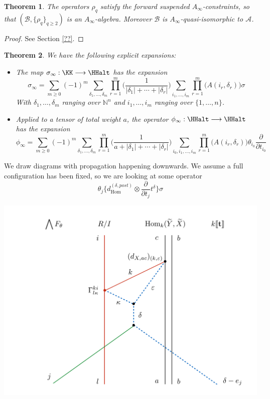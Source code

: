\documentclass[english,letter paper,12pt,leqno]{article}
\newtheorem{theorem}{Theorem}[section]
\theoremstyle{example}
\numberwithin{equation}{section}
\def\Hom{\operatorname{Hom}}
\begin{document}
\begin{theorem} The operators $\rho_q$ satisfy the forward suspended $A_\infty$-constraints, so that $(\mathscr{B}, \{ \rho_q \}_{q \ge 2})$ is an $A_\infty$-algebra. Moreover $\mathscr{B}$ is $A_\infty$-quasi-isomorphic to $\mathscr{A}$.
\end{theorem}
\begin{proof}
See Section \ref{??}.
\end{proof}

\begin{theorem} We have the following explicit expansions:
\begin{itemize} 
\item The map $\sigma_\infty: \KK \lto \HHalt$ has the expansion
\[
\sigma_\infty = \sum_{m \ge 0} (-1)^m \sum_{\delta_1,\ldots,\delta_m} \prod_{r=1}^m\Big( \frac{1}{|\delta_1| + \cdots + |\delta_r|} \Big) \sum_{i_1,\ldots,i_m} \prod_{r=1}^m \Big( A(i_r, \delta_r) \Big) \sigma
\]
With $\delta_1,\ldots,\delta_m$ ranging over $\mathbb{N}^n$ and $i_1,\ldots,i_m$ ranging over $\{ 1, \ldots, n \}$. 
\item Applied to a tensor of total weight $a$, the operator $\phi_\infty: \HHalt \lto \HHalt$ has the expansion
\[
\phi_\infty = \sum_{m \ge 0} (-1)^m \sum_{\delta_1,\ldots,\delta_m} \prod_{r=1}^m\Big( \frac{1}{a + |\delta_1| + \cdots + |\delta_r|} \Big) \sum_{i_0, i_1,\ldots,i_m} \prod_{r=1}^m \Big( A(i_r, \delta_r)\Big) \theta_{i_0} \frac{\partial}{\partial t_{i_0}}
\]
\end{itemize}
\end{theorem}

We draw diagrams with propagation happening downwards. We assume a full configuration has been fixed, so we are looking at some operator
\[
\theta_{j} \big\{ d_{\Hom}^{(\delta,post)} \otimes \frac{\partial}{\partial t_{j}} t^{\delta} \big\} \sigma
\]

\begin{center}
\includegraphics[scale=0.4]{dia15}
\end{center}
\end{document}
